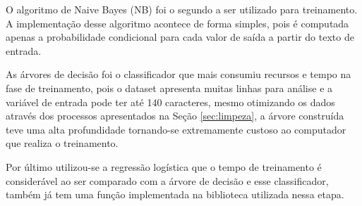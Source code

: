 O algoritmo de Naive Bayes (NB) foi o segundo a ser utilizado para treinamento. A implementação desse algoritmo acontece de forma simples, pois é 
computada apenas a probabilidade condicional para cada valor de saída a partir do texto de entrada.


 As árvores de decisão foi o classificador que mais consumiu recursos e tempo na fase de treinamento, pois o dataset apresenta muitas linhas para análise
 e a variável de entrada pode ter até 140 caracteres, mesmo otimizando os dados através dos processos apresentados na Seção \ref{sec:limpeza}, 
 a árvore construída teve uma alta profundidade tornando-se extremamente custoso ao computador que realiza o treinamento.
 
 Por último utilizou-se a regressão logística que o tempo de treinamento é considerável ao ser comparado com a árvore de decisão e esse classificador,
 também já tem uma função implementada na biblioteca utilizada nessa etapa.
